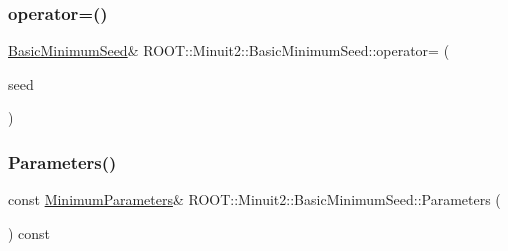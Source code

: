 \mbox{\label{classROOT_1_1Minuit2_1_1BasicMinimumSeed_aeffefca123cbfd95d19fa7fb7e087431}} 
\subsubsection{\texorpdfstring{operator=()}{operator=()}\hspace{0.1cm}{\footnotesize\ttfamily [2/2]}}
{\footnotesize\ttfamily \mbox{\hyperlink{classROOT_1_1Minuit2_1_1BasicMinimumSeed}{Basic\+Minimum\+Seed}}\& R\+O\+O\+T\+::\+Minuit2\+::\+Basic\+Minimum\+Seed\+::operator= (\begin{DoxyParamCaption}\item[{const \mbox{\hyperlink{classROOT_1_1Minuit2_1_1BasicMinimumSeed}{Basic\+Minimum\+Seed}} \&}]{seed }\end{DoxyParamCaption})\hspace{0.3cm}{\ttfamily [inline]}}

\mbox{\label{classROOT_1_1Minuit2_1_1BasicMinimumSeed_a0aec3622cdc4f1c52a4be74f8b96059a}} 
\subsubsection{\texorpdfstring{Parameters()}{Parameters()}\hspace{0.1cm}{\footnotesize\ttfamily [1/2]}}
{\footnotesize\ttfamily const \mbox{\hyperlink{classROOT_1_1Minuit2_1_1MinimumParameters}{Minimum\+Parameters}}\& R\+O\+O\+T\+::\+Minuit2\+::\+Basic\+Minimum\+Seed\+::\+Parameters (\begin{DoxyParamCaption}{ }\end{DoxyParamCaption}) const\hspace{0.3cm}{\ttfamily [inline]}}

